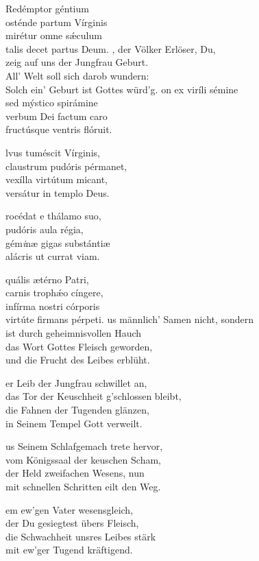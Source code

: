 \documentclass[fontsize=10pt,paper=A5,twoside,BCOR=1mm,DIV=21,headinclude]{scrarticle}
\begin{document}
\begin{paracol}{2}\pcb
\begin{hymnus}
 Redémptor géntium\\
\hspace{1.6em} osténde partum Vírginis\\
mirétur omne s\'æculum\\
talis decet partus Deum.
	\switchcolumn
	, der Völker Erlöser, Du,\\
	\hspace{1.6em} zeig auf uns der Jungfrau Geburt.\\
	All' Welt soll sich darob wundern:\\
	Solch ein' Geburt ist Gottes würd'g.
\switchcolumn*
{}on ex viríli sémine\\
sed mýstico spirámine\\
verbum Dei factum caro\\
fructúsque ventris flóruit.

lvus tuméscit Vírginis,\\
claustrum pudóris pérmanet,\\
vexílla virtútum micant,\\
versátur in templo Deus.

rocédat e thálamo suo,\\
pudóris aula régia,\\
gém\textit{i}næ gigas substántiæ\\
alácris ut currat viam.

quális ætérno Patri,\\
carnis troph\'æo cíngere,\\
infírma nostri córporis\\
virtúte firmans pérpeti.
\switchcolumn
{}us männlich' Samen nicht, sondern\\
ist durch geheimnisvollen Hauch\\
das Wort Gottes Fleisch geworden,\\
und die Frucht des Leibes erblüht.

er Leib der Jungfrau schwillet an,\\
das Tor der Keuschheit g'schlossen bleibt,\\
die Fahnen der Tugenden glänzen,\\
in Seinem Tempel Gott verweilt.

us Seinem Schlafgemach trete hervor,\\
vom Königssaal der keuschen Scham,\\
der Held zweifachen Wesens, nun\\
mit schnellen Schritten eilt den Weg.

em ew'gen Vater wesensgleich,\\
der Du gesiegtest übers Fleisch,\\
die Schwachheit unsres Leibes stärk\\
mit ew'ger Tugend kräftigend.
\end{hymnus}
\end{paracol}
\end{document}
